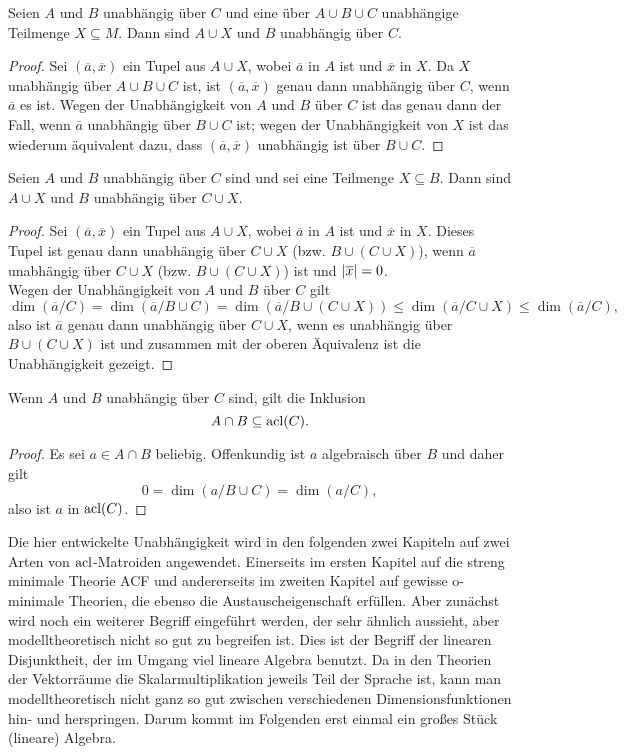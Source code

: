 \begin{lemma}
	Seien $A$ und $B$ unabhängig über $C$ und eine über $A\cup B\cup C$ unabhängige Teilmenge $X\subseteq M$. Dann sind $A\cup X$ und $B$ unabhängig über $C$.
\end{lemma}
\begin{proof}
	Sei $(\overline{a},\overline{x})$ ein Tupel aus $A\cup X$, wobei $\overline{a}$ in $A$ ist und $\overline{x}$ in $X$. Da $X$ unabhängig über $A\cup B\cup C$ ist, ist $(\overline{a},\overline{x})$ genau dann unabhängig über $C$, wenn $\overline{a}$ es ist. Wegen der Unabhängigkeit von $A$ und $B$ über $C$ ist das genau dann der Fall, wenn $\overline{a}$ unabhängig über $B\cup C$ ist; wegen der Unabhängigkeit von $X$ ist das wiederum äquivalent dazu, dass $(\overline{a},\overline{x})$ unabhängig ist über $B\cup C$.
\end{proof}
\newpage
\begin{lemma}
	Seien $A$ und $B$ unabhängig über $C$ sind und sei eine Teilmenge $X\subseteq B$. Dann sind $A\cup X$ und $B$ unabhängig über $C\cup X$.
\end{lemma}
\begin{proof}
	Sei $(\overline{a},\overline{x})$ ein Tupel aus $A\cup X$, wobei $\overline{a}$ in $A$ ist und $\overline{x}$ in $X$. Dieses Tupel ist genau dann unabhängig über $C\cup X$ (bzw. $B\cup(C\cup X)$), wenn $\overline{a}$ unabhängig über $C\cup X$ (bzw. $B\cup(C\cup X)$) ist und ${\left| \overline{x} \right|}=0$.\\
	Wegen der Unabhängigkeit von $A$ und $B$ über $C$ gilt $$\dim(\overline{a}/C)=\dim(\overline{a}/B\cup C)=\dim(\overline{a}/B\cup(C\cup X))\leq\dim(\overline{a}/C\cup X)\leq\dim(\overline{a}/C),$$ also ist $\overline{a}$ genau dann unabhängig über $C\cup X$, wenn es unabhängig über $B\cup(C\cup X)$ ist und zusammen mit der oberen Äquivalenz ist die Unabhängigkeit gezeigt.
\end{proof}

\begin{lemma}
	Wenn $A$ und $B$ unabhängig über $C$ sind, gilt die Inklusion $$A\cap B\subseteq\operatorname{acl}(C).$$
\end{lemma}
\begin{proof}
	Es sei $a\in A\cap B$ beliebig. Offenkundig ist $a$ algebraisch über $B$ und daher gilt $$0=\dim(a/B\cup C)=\dim(a/C),$$ also ist $a$ in $\operatorname{acl}(C)$.
\end{proof}

Die hier entwickelte Unabhängigkeit wird in den folgenden zwei Kapiteln auf zwei Arten von $\operatorname{acl}$-Matroiden angewendet. Einerseits im ersten Kapitel auf die streng minimale Theorie ACF und andererseits im zweiten Kapitel auf gewisse o-minimale Theorien, die ebenso die Austauscheigenschaft erfüllen. Aber zunächst wird noch ein weiterer Begriff eingeführt werden, der sehr ähnlich aussieht, aber modelltheoretisch nicht so gut zu begreifen ist. Dies ist der Begriff der linearen Disjunktheit, der im Umgang viel lineare Algebra benutzt. Da in den Theorien der Vektorräume die Skalarmultiplikation jeweils Teil der Sprache ist, kann man modelltheoretisch nicht ganz so gut zwischen verschiedenen Dimensionsfunktionen hin- und herspringen. Darum kommt im Folgenden erst einmal ein großes Stück (lineare) Algebra.